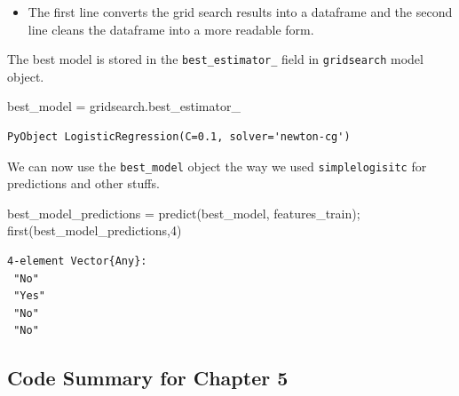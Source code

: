 \documentclass[
  letterpaper,
]{book}
\newenvironment{Shaded}{\begin{snugshade}}{\end{snugshade}}
\newcommand{\FloatTok}[1]{\textcolor[rgb]{0.68,0.00,0.00}{#1}}
\newcommand{\FunctionTok}[1]{\textcolor[rgb]{0.28,0.35,0.67}{#1}}
\newcommand{\NormalTok}[1]{\textcolor[rgb]{0.00,0.23,0.31}{#1}}
\newcommand{\OperatorTok}[1]{\textcolor[rgb]{0.37,0.37,0.37}{#1}}
\providecommand{\tightlist}{%
  \setlength{\itemsep}{0pt}\setlength{\parskip}{0pt}}\usepackage{longtable,booktabs,array}
\begin{document}
\begin{itemize}
\tightlist
\item
  The first line converts the grid search results into a dataframe and
  the second line cleans the dataframe into a more readable form.
\end{itemize}

The best model is stored in the \texttt{best\_estimator\_} field in
\texttt{gridsearch} model object.

\begin{Shaded}
\begin{Highlighting}[]
\NormalTok{best\_model }\OperatorTok{=}\NormalTok{ gridsearch.best\_estimator\_ }
\end{Highlighting}
\end{Shaded}

\begin{verbatim}
PyObject LogisticRegression(C=0.1, solver='newton-cg')
\end{verbatim}

We can now use the \texttt{best\_model} object the way we used
\texttt{simplelogisitc} for predictions and other stuffs.

\begin{Shaded}
\begin{Highlighting}[]
\NormalTok{best\_model\_predictions }\OperatorTok{=} \FunctionTok{predict}\NormalTok{(best\_model, features\_train);}
\FunctionTok{first}\NormalTok{(best\_model\_predictions,}\FloatTok{4}\NormalTok{)}
\end{Highlighting}
\end{Shaded}

\begin{verbatim}
4-element Vector{Any}:
 "No"
 "Yes"
 "No"
 "No"
\end{verbatim}

\hypertarget{code-summary-for-chapter-5}{%
\subsection*{Code Summary for Chapter
5}\label{code-summary-for-chapter-5}}
\end{document}
